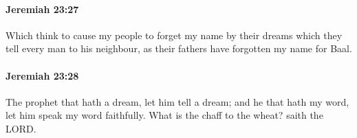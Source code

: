 		\paragraph{Jeremiah 23:27} %
			\label{JEREMIAH-23-27}

			Which think to cause my people to forget my name by their dreams which they tell every man to his neighbour, as their fathers have forgotten my name for Baal.


		\paragraph{Jeremiah 23:28} %
			\label{JEREMIAH-23-28}

			The prophet that hath a dream, let him tell a dream; and he that hath my word, let him speak my word faithfully. What is the chaff to the wheat? saith the LORD.


